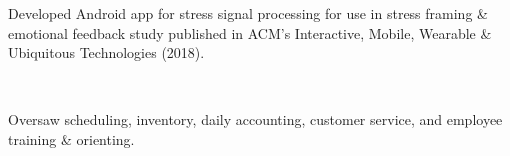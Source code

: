 \documentclass[]{hieudo-build}
\begin{document}
\begin{minipage}[t]{0.63\textwidth}
\begin{tightemize}
\item Developed Android app for stress signal processing for use in stress framing \& emotional feedback study published in ACM's
Interactive, Mobile, Wearable \& Ubiquitous Technologies (2018). \\
\smallskip
{}
\end{tightemize}
\sectionsep


 \\
\begin{tightemize}
\item Oversaw scheduling, inventory, daily accounting, customer service, and employee training \& orienting.
\end{tightemize}
\sectionsep

%
%
\end{minipage} 
\hfill
\end{document}
